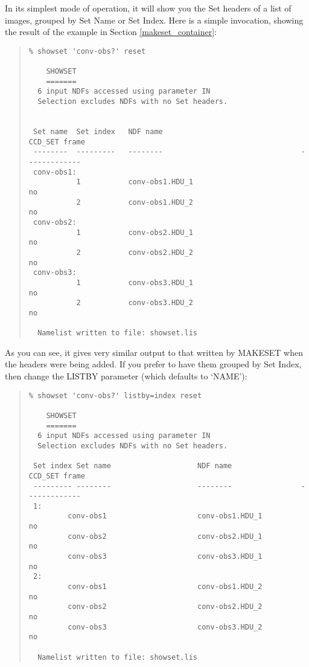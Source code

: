 \documentclass[twoside,11pt]{article}
\renewcommand{\_}{\texttt{\symbol{95}}}
\newenvironment{myquote}{\begin{quote}\begin{small}}{\end{small}\end{quote}}
\newcommand{\routine}[1]{{\sc #1}}
\begin{document}
In its simplest mode of operation, it will show you the Set headers
of a list of images, grouped by Set Name or Set Index.
Here is a simple invocation, showing the result of the
example in Section \ref{makeset_container}:
\begin{myquote}
\begin{verbatim}
% showset 'conv-obs?' reset 

    SHOWSET
    =======
  6 input NDFs accessed using parameter IN
  Selection excludes NDFs with no Set headers.


 Set name  Set index   NDF name                                CCD_SET frame
 --------  ---------   --------                                -------------
 conv-obs1:
           1           conv-obs1.HDU_1                               no
           2           conv-obs1.HDU_2                               no
 conv-obs2:
           1           conv-obs2.HDU_1                               no
           2           conv-obs2.HDU_2                               no
 conv-obs3:
           1           conv-obs3.HDU_1                               no
           2           conv-obs3.HDU_2                               no

  Namelist written to file: showset.lis
\end{verbatim}
\end{myquote}
As you can see, it gives very similar output to that written
by \routine{MAKESET} when the headers were being added.
If you prefer to have them grouped by Set Index, then change the
LISTBY parameter (which defaults to `NAME'):
\begin{myquote}
\begin{verbatim}
% showset 'conv-obs?' listby=index reset

    SHOWSET
    =======
  6 input NDFs accessed using parameter IN
  Selection excludes NDFs with no Set headers.

 Set index Set name                    NDF name                CCD_SET frame
 --------- --------                    --------                -------------
 1:
         conv-obs1                     conv-obs1.HDU_1               no
         conv-obs2                     conv-obs2.HDU_1               no
         conv-obs3                     conv-obs3.HDU_1               no
 2:
         conv-obs1                     conv-obs1.HDU_2               no
         conv-obs2                     conv-obs2.HDU_2               no
         conv-obs3                     conv-obs3.HDU_2               no

  Namelist written to file: showset.lis
\end{verbatim}
\end{myquote}
\end{document}
